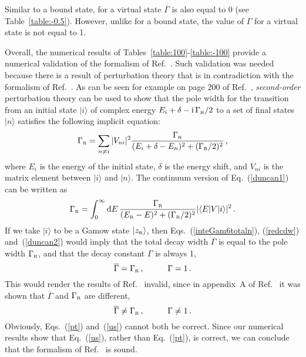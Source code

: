 \documentclass[12pt]{article}
\newcommand{\rmi}{{\rm i}}
\newcommand{\rmd}{{\rm d}}
\newcommand{\zr}{z_{\text{\tiny R}}}
\newcommand{\gr}{\Gamma _{\text{\tiny R}}}
\newcommand{\er}{E_{\text{\tiny R}}}
\begin{document}
Similar to a bound state, for a virtual state 
$\overline{\Gamma}$ is also equal to 0 (see Table~\ref{table:-0.5}). However,
unlike for a bound state, the value of $\Gamma$ for a virtual state is
not equal to 1.

Overall, the numerical results of Tables~\ref{table:100}-\ref{table:-100}
provide a numerical validation of the formalism of Ref.~\cite{NPA15}. Such
validation was needed because
there is a result of perturbation theory that is in contradiction
with the formalism of Ref.~\cite{NPA15}. As can be seen for example
on page 200 of Ref.~\cite{DUNCAN}, {\it second-order} perturbation theory can
be used to show that the pole width for the transition from 
an initial state $|i\rangle$ of complex energy $E_i+\delta -\rmi \, \gr/2$
to a set of final states $|n\rangle$ satisfies the following implicit
equation:
\begin{equation}
        \gr = \sum_{n\neq i} |V_{ni}|^2 
           \frac{\gr}{(E_i+\delta -E_n)^2+ (\gr /2)^2} \, ,
       \label{duncan1}
\end{equation}
where $E_i$ is the energy of the initial state, $\delta$ is the energy
shift, and $V_{ni}$ is the matrix element between
$|i\rangle$ and $|n\rangle$. The continuum version of 
Eq.~(\ref{duncan1}) can be written as
\begin{equation}
        \gr = \int_0^\infty \rmd E \, 
           \frac{\gr}{(\er -E)^2+ (\gr /2)^2} |\langle E|V|i\rangle|^2  \, .
       \label{duncan2}
\end{equation}
If we take $|i\rangle$ to be a Gamow state $|\zr\rangle$, then 
Eqs.~(\ref{inteGam6totaln}), (\ref{redcdw}) and~(\ref{duncan2}) 
would imply that 
the total decay width $\overline{\Gamma}$ is equal to the pole width
$\gr$, and that the decay constant $\Gamma$ is always 1,
\begin{equation}
       \overline{\Gamma} =\gr \, ,  \hskip1cm \Gamma =1 \, .
         \label{pt}
\end{equation}
This would render the
results of Ref.~\cite{NPA15} invalid, since in appendix~A of Ref.~\cite{NPA15}
it was shown that $\overline{\Gamma}$ and $\gr$ are different,
\begin{equation}
       \overline{\Gamma} \neq \gr \, ,  \hskip1cm \Gamma \neq 1 \, .
         \label{us}
\end{equation}
Obviously, Eqs.~(\ref{pt}) and~(\ref{us}) cannot both be correct. Since our 
numerical results show that Eq.~(\ref{us}), rather than
Eq.~(\ref{pt}), is correct, we can conclude that the formalism of 
Ref.~\cite{NPA15} is sound. 
\end{document}
